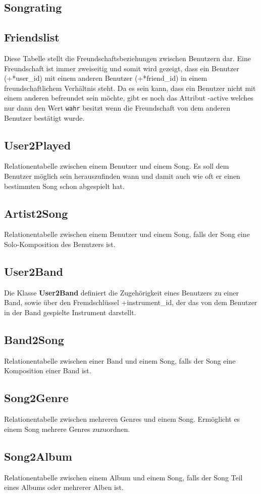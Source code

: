 \documentclass[11pt,a4paper,DIV=9]{scrartcl}
\begin{document}
  \subsection{Songrating}
  \subsection{Friendslist}
    Diese Tabelle stellt die Freundschaftsbeziehungen zwischen Benutzern dar. Eine Freundschaft ist immer zweiseitig und somit wird gezeigt, dass ein Benutzer (+*user\_id) mit einem anderen Benutzer (+*friend\_id) in einem freundschaftlichem Verhältnis steht. Da es sein kann, dass ein Benutzer nicht mit einem anderen befreundet sein möchte, gibt es noch das Attribut -active welches nur dann den Wert \texttt{wahr} besitzt wenn die Freundschaft von dem anderen Benutzer bestätigt wurde.
  \subsection{User2Played}
    Relationentabelle zwischen einem Benutzer und einem Song. Es soll dem Benutzer möglich sein herauszufinden wann und damit auch wie oft er einen bestimmten Song schon abgespielt hat.
  \subsection{Artist2Song}
    Relationentabelle zwischen einem Benutzer und einem Song, falls der Song eine Solo-Komposition des Benutzers ist.
  \subsection{User2Band}
    Die Klasse \textbf{User2Band} definiert die Zugehörigkeit eines Benutzers zu einer Band, sowie über den Fremdschlüssel +instrument\_id, der das von dem Benutzer in der Band gespielte Instrument darstellt.
  \subsection{Band2Song}
    Relationentabelle zwischen einer Band und einem Song, falls der Song eine Komposition einer Band ist.
  \subsection{Song2Genre}
    Relationentabelle zwischen mehreren Genres und einem Song. Ermöglicht es einem Song mehrere Genres zuzuordnen.
  \subsection{Song2Album}
    Relationentabelle zwischen einem Album und einem Song, falls der Song Teil eines Albums oder mehrerer Alben ist.
\end{document}
